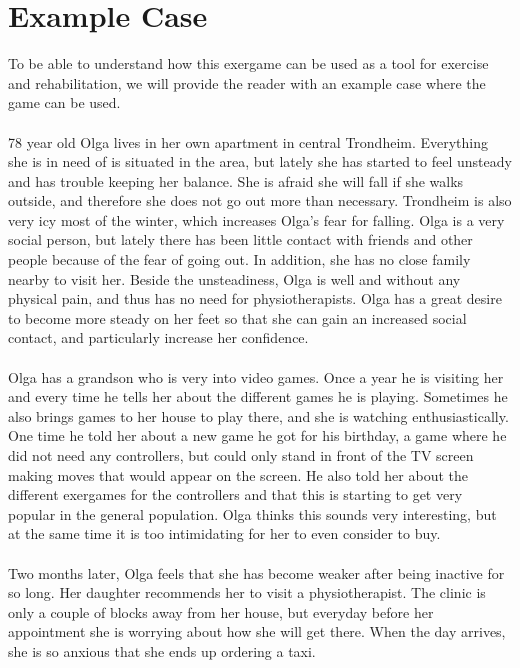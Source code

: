 \section{Example Case}
To be able to understand how this exergame can be used as a tool for exercise and rehabilitation, we will provide the reader with an example case where the game can be used. \\ \\
78 year old Olga lives in her own apartment in central Trondheim. Everything she is in need of is situated in the area, but lately she has started  to feel unsteady and has trouble keeping her balance. She is afraid she will fall if she walks outside, and therefore she does not go out more than necessary. Trondheim is also very icy most of the winter, which increases Olga's fear for falling. Olga is a very social person, but lately there has been little contact with friends and other people because of the fear of going out. In addition, she has no close family nearby to visit her. Beside the unsteadiness, Olga is well and without any physical pain, and thus has no need for physiotherapists. Olga has a great desire to become more steady on her feet so that she can gain an increased social contact, and particularly increase her confidence. \\ \\
Olga has a grandson who is very into video games. Once a year he is visiting her and every time he tells her about the different games he is playing. Sometimes he also brings games to her house to play there, and she is watching enthusiastically. One time he told her about a new game he got for his birthday, a game where he did not need any controllers, but could only stand in front of the TV screen making moves that would appear on the screen. He also told her about the different exergames for the controllers and that this is starting to get very popular in the general population. Olga thinks this sounds very interesting, but at the same time it is too intimidating for her to even consider to buy.   \\ \\
Two months later, Olga feels that she has become weaker after being inactive for so long. Her daughter recommends her to visit a physiotherapist. The clinic is only a couple of blocks away from her house, but everyday before her appointment she is worrying about how she will get there. When the day arrives, she is so anxious that she ends up ordering a taxi. \\ \\

